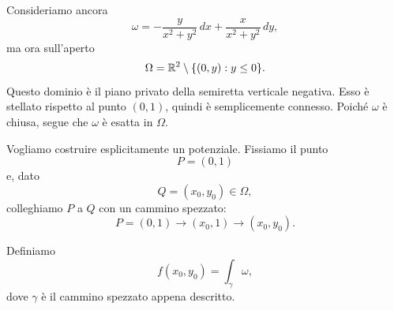 \documentclass[a4paper]{article}
\begin{document}
Consideriamo ancora
\[
    \omega
    =
    -\frac{y}{x^2+y^2}\,dx
    +
    \frac{x}{x^2+y^2}\,dy,
\]
ma ora sull'aperto
\[
    \Omega
    =
    \mathbb{R}^2\setminus\{(0,y):y\leq 0\}.
\]
Questo dominio è il piano privato della semiretta verticale negativa. Esso è stellato rispetto al punto \((0,1)\), quindi è semplicemente connesso. Poiché \(\omega\) è chiusa, segue che \(\omega\) è esatta in \(\Omega\).

Vogliamo costruire esplicitamente un potenziale. Fissiamo il punto
\[
    P=(0,1)
\]
e, dato
\[
    Q=(x_0,y_0)\in\Omega,
\]
colleghiamo \(P\) a \(Q\) con un cammino spezzato:
\[
    P=(0,1)
    \longrightarrow
    (x_0,1)
    \longrightarrow
    (x_0,y_0).
\]

\begin{center}
\end{center}

Definiamo
\[
    f(x_0,y_0)=\int_\gamma\omega,
\]
dove \(\gamma\) è il cammino spezzato appena descritto.
\end{document}
